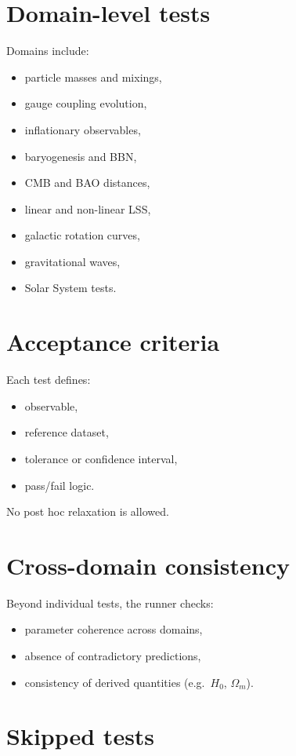 \documentclass[11pt]{book}
\begin{document}
\section{Domain-level tests}

Domains include:
\begin{itemize}
\item particle masses and mixings,
\item gauge coupling evolution,
\item inflationary observables,
\item baryogenesis and BBN,
\item CMB and BAO distances,
\item linear and non-linear LSS,
\item galactic rotation curves,
\item gravitational waves,
\item Solar System tests.
\end{itemize}

\section{Acceptance criteria}

Each test defines:
\begin{itemize}
\item observable,
\item reference dataset,
\item tolerance or confidence interval,
\item pass/fail logic.
\end{itemize}

No post hoc relaxation is allowed.

\section{Cross-domain consistency}

Beyond individual tests, the runner checks:
\begin{itemize}
\item parameter coherence across domains,
\item absence of contradictory predictions,
\item consistency of derived quantities (e.g.\ $H_0$, $\Omega_m$).
\end{itemize}

\section{Skipped tests}
\end{document}
